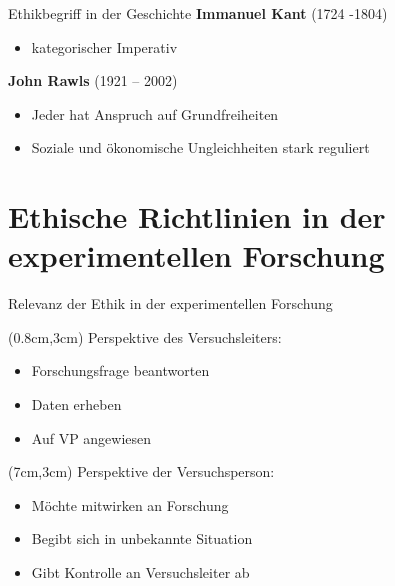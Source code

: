 \documentclass[10pt]{beamer}
\begin{document}
	\begin{frame}{Ethikbegriff in der Geschichte}
		\textbf{Immanuel Kant} (1724 -1804)
		\begin{itemize}
			\item kategorischer Imperativ
		\end{itemize}
		
		\textbf{John Rawls} (1921 – 2002) 
		\begin{itemize}
			\item Jeder hat Anspruch auf Grundfreiheiten
			\item Soziale und ökonomische Ungleichheiten stark reguliert
		\end{itemize}
	\end{frame}
\section{Ethische Richtlinien in der experimentellen Forschung}
	\begin{frame}{Relevanz der Ethik in der experimentellen Forschung}
		\begin{textblock*}{5cm}(0.8cm,3cm) %
		Perspektive des Versuchsleiters:
		\begin{itemize}
		\item Forschungsfrage beantworten	%
		\item Daten erheben
		\item Auf VP angewiesen %
		\end{itemize}
	\end{textblock*}
		
		\begin{textblock*}{5cm}(7cm,3cm) %
			Perspektive der Versuchsperson:
			\begin{itemize}
				\item Möchte mitwirken an Forschung	%
				\item Begibt sich in unbekannte Situation
				\item Gibt Kontrolle an Versuchsleiter ab %
			\end{itemize}
		\end{textblock*}
	\end{frame}
	
\end{document}
